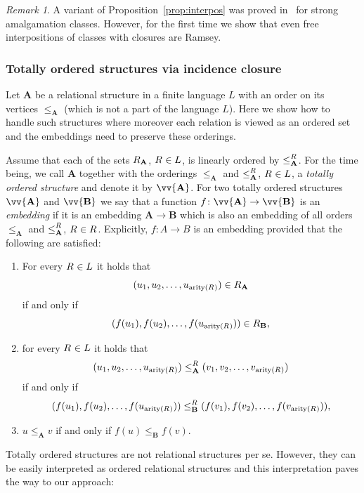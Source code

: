 \documentclass{elsarticle}
\def\str#1{\mathbf {#1}}
\def\arity#1{\mathop{\mathrm{arity}}\nolimits(\rel{}{#1})}
\def\nbrel#1#2{R\ifstrempty{#1}{}{_{#1}}\ifstrempty{#2}{}{^{#2}}}
\def\rel#1#2{\nbrel{\ifstrempty{#1}{}{\str{#1}}}{#2}}
\theoremstyle{plain}
\theoremstyle{definition}
\theoremstyle{remark}
\newtheorem*{remark}{Remark}
\begin{document}
\begin{remark}
A variant of Proposition~\ref{prop:interpos} was proved in~\cite{Bodirsky2015} for strong amalgamation classes.
However, for the first time we show that even free interpositions of classes with closures
are Ramsey. 
\end{remark}




\subsubsection{Totally ordered structures via incidence closure}
\label{sec:fatorders}
Let $\str{A}$ be a relational structure in a finite language $L$ with an order on its vertices $\leq_\str{A}$ (which is not a part of the language $L$).
Here we show how to handle such structures where moreover each relation is viewed as an ordered set and the embeddings need to preserve these orderings.

Assume that each of the sets $\rel{A}{}$, $\rel{}{}\in L$, is linearly ordered by $\leq^{\rel{}{}}_\str{A}$.
For the time being, we call $\str{A}$ together with the orderings $\leq_\str{A}$ and $\leq^{\rel{}{}}_\str{A}$, $\rel{}{}\in L$, a \emph{totally ordered structure} and denote it by $\vv{\str{A}}$.
For two totally ordered structures $\vv{\str{A}}$ and $\vv{\str{B}}$ we say that a function $f\colon\vv{\str{A}}\to\vv{\str{B}}$ is an \emph{embedding} if it is an embedding $\str{A}\to \str{B}$ which is also an embedding of all orders $\leq_\str{A}$ and $\leq^{\rel{}{}}_\str{A}$, $\rel{}{}\in R$. Explicitly, $f\colon A\to B$ is an embedding provided that the following are satisfied:
\begin{enumerate}
\item For every $\rel{}{}\in L$ it holds that $$(u_1,u_2,\ldots,u_{\arity{}})\in \rel{A}{}$$ if and only if $$(f(u_1),f(u_2),\ldots,f(u_{\arity{}}))\in \rel{B}{},$$
\item for every $\rel{}{}\in L$ it holds that
$$(u_1, u_2,\ldots,u_{\arity{}})\leq^{\rel{}{}}_\str{A}(v_1,v_2,\ldots, v_{\arity{}})$$ if and only if $$(f(u_1),f(u_2),\ldots, f(u_{\arity{}}))\leq^{\rel{}{}}_\str{B} (f(v_1), f(v_2),\ldots, f(v_{\arity{}})),$$
\item $u\leq_\str{A} v$ if and only if $f(u)\leq_\str{B} f(v).$
\end{enumerate}
Totally ordered structures are not relational structures per se. However, they can be easily interpreted as ordered relational structures and this interpretation paves the way to our approach:
\end{document}
